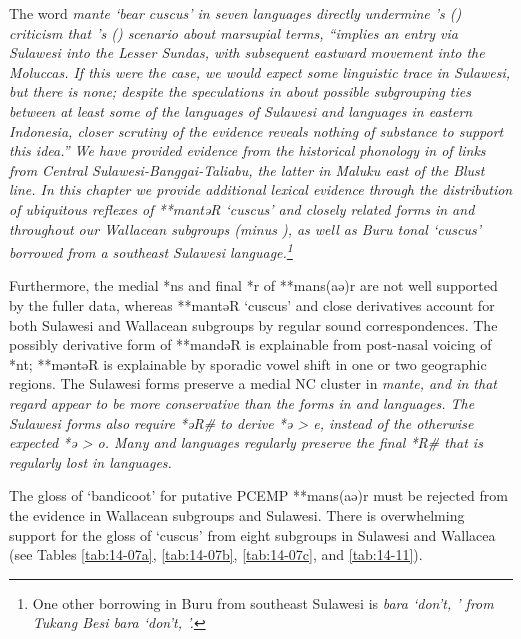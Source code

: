 The  word \it{mante} ‘bear cuscus’ in seven languages
directly undermine \citeauthor{Blust2012b}’s (\citeyear[274]{Blust2012b})
criticism that \citeauthor{Schapper2011}’s (\citeyear{Schapper2011}) scenario about marsupial terms,
“implies an entry via Sulawesi into the Lesser Sundas,
with subsequent eastward movement into the Moluccas.
If this were the case,
we would expect some linguistic trace in Sulawesi,
but there is none; despite the speculations in \citet{DonohueGrimes2008}
about possible subgrouping ties between at least some of the
languages of Sulawesi and languages in eastern Indonesia,
closer scrutiny of the evidence reveals nothing of substance
to support this idea.” We have provided evidence from the historical
phonology in  of links from Central Sulawesi-Banggai-Taliabu,
the latter in Maluku east of the Blust line.
In this chapter we provide additional lexical evidence through
the distribution of ubiquitous reflexes of **mantəR ‘cuscus’
and closely related forms in 
and throughout our Wallacean subgroups (minus ),
as well as Buru \it{tonal} ‘cuscus’ borrowed from a southeast Sulawesi language.\footnote{
		One other borrowing in Buru from southeast Sulawesi is \it{bara}
		`don't, '
		from Tukang Besi \it{bara} `don't, '.}

Furthermore, the medial *ns
and final *r of **mans(aə)r are not well supported by the fuller
data, whereas **mantəR ‘cuscus’ and close derivatives account for both
Sulawesi and Wallacean subgroups by regular sound correspondences.
The possibly derivative form of **mandəR is explainable from
post-nasal voicing of *nt; **məntəR is explainable by sporadic
vowel shift in one or two geographic regions.
The Sulawesi forms preserve a medial NC cluster in \it{mante},
and in that regard appear to be more conservative than the forms
in  and  languages.
The Sulawesi forms also require *əR{\#} to derive *ə > \it{e},
instead of the otherwise expected *ə > \it{o}.
Many  and  languages
regularly preserve the final *R{\#} that is regularly lost in  languages.

The gloss of ‘bandicoot’ for putative PCEMP **mans(aə)r must
be rejected from the evidence in Wallacean subgroups
and Sulawesi.
There is overwhelming support for the gloss of ‘cuscus’ from
eight subgroups in Sulawesi
and Wallacea (see Tables \ref{tab:14-07a},
\ref{tab:14-07b}, \ref{tab:14-07c}, and \ref{tab:14-11}).

